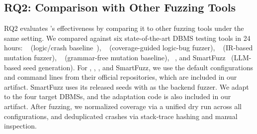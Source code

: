 \documentclass[conference]{IEEEtran}
\begin{document}
\subsection{RQ2: Comparison with Other Fuzzing Tools}
RQ2 evaluates \tool{}'s effectiveness by comparing it to other fuzzing tools under the same setting. 
We compared \tool{} against six state-of-the-art DBMS testing tools in 24 hours: \sqlancer{}~\cite{sqlancer} (logic/crash baseline~\cite{zhong2020squirrel,fu2022griffin,liang2023sequence}), \sqlright{}~\cite{sqlright} (coverage-guided logic-bug fuzzer), \squirrel{}~\cite{zhong2020squirrel} (IR-based mutation fuzzer), \griffin{}~\cite{fu2022griffin} (grammar-free mutation baseline), \sedar{}~\cite{fu2024sedar}, and SmartFuzz~\cite{lin2026smartfuzz} (LLM-based seed generation).
For \sqlancer{}, \squirrel{}, \griffin{}, and SmartFuzz, we use the default configurations and command lines from their official repositories, which are included in our artifact. SmartFuzz uses its released seeds with \griffin{} as the backend fuzzer.
We adapt \sqlright{} to the four target DBMSs, and the adaptation code is also included in our artifact.
After fuzzing, we normalized coverage via a unified dry run across all configurations, and deduplicated crashes via stack-trace hashing and manual inspection.
\end{document}

